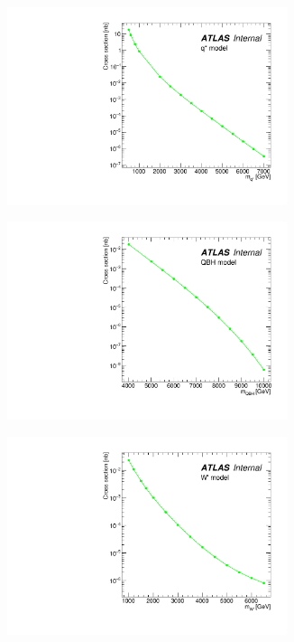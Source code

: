 \begin{figure}[htbp]
  \begin{subfigure}{.5\textwidth}
  \centering
   \includegraphics[width=0.9\textwidth]{figuresDijet/03-BenchmarkSignals/Xsec_Qstar.pdf}
   \caption{}
   \label{fig:QStar}
  \end{subfigure}
  \begin{subfigure}{.5\textwidth}
  \centering
   \includegraphics[width=0.9\textwidth]{figuresDijet/03-BenchmarkSignals/Xsec_QBH.pdf}
   \caption{}
   \label{fig:QBH}
  \end{subfigure}
\newline
  \begin{subfigure}{.5\textwidth}
  \centering
   \includegraphics[width=0.9\textwidth]{figuresDijet/03-BenchmarkSignals/Xsec_Wprime.pdf}

\end{subfigure}
\end{figure}
